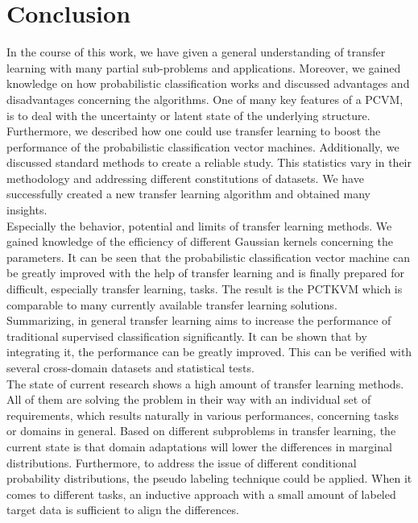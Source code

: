 \chapter{Conclusion}\label{ConChap}	
In the course of this work, we have given a general understanding of transfer learning with many partial sub-problems and applications.
Moreover, we gained knowledge on how probabilistic classification works and discussed advantages and disadvantages concerning the algorithms.
One of many key features of a \acs{PCVM}, is to deal with the uncertainty or latent state of the underlying structure.\\
Furthermore, we described how one could use transfer learning to boost the performance of the probabilistic classification vector machines.
Additionally, we discussed standard methods to create a reliable study.
This statistics vary in their methodology and addressing different constitutions of datasets.
We have successfully created a new transfer learning algorithm and obtained many insights.\\
Especially the behavior, potential and limits of transfer learning methods.
We gained knowledge of the efficiency of different Gaussian kernels concerning the parameters.
It can be seen that the probabilistic classification vector machine can be greatly improved with the help of transfer learning and is finally prepared for difficult, especially transfer learning, tasks.
The result is the \acl{PCTKVM} which is comparable to many currently available transfer learning solutions.\\ 
Summarizing, in general transfer learning aims to increase the performance of traditional supervised classification significantly.
It can be shown that by integrating it, the performance can be greatly improved.
This can be verified with several cross-domain datasets and statistical tests.\\
The state of current research shows a high amount of transfer learning methods.\cite[p. 33]{Weiss.2016}
All of them are solving the problem in their way with an individual set of requirements, which results naturally in various performances, concerning tasks or domains in general.
Based on different subproblems in transfer learning, the current state is that domain adaptations will lower the differences in marginal distributions. Furthermore, to address the issue of different conditional probability distributions, the pseudo labeling technique could be applied. When it comes to different tasks, an inductive approach with a small amount of labeled target data is sufficient to align the differences.
